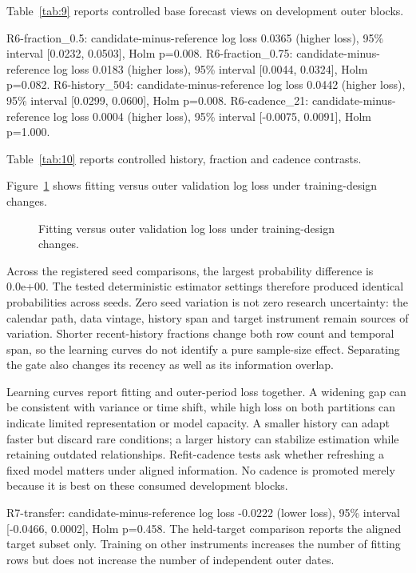 \noindent Table~\ref{tab:9} reports controlled base forecast views on development outer blocks.



R6-fraction\_0.5: candidate-minus-reference log loss 0.0365 (higher loss), 95\% interval [0.0232, 0.0503], Holm p=0.008. R6-fraction\_0.75: candidate-minus-reference log loss 0.0183 (higher loss), 95\% interval [0.0044, 0.0324], Holm p=0.082. R6-history\_504: candidate-minus-reference log loss 0.0442 (higher loss), 95\% interval [0.0299, 0.0600], Holm p=0.008. R6-cadence\_21: candidate-minus-reference log loss 0.0004 (higher loss), 95\% interval [-0.0075, 0.0091], Holm p=1.000.

\noindent Table~\ref{tab:10} reports controlled history, fraction and cadence contrasts.



\noindent Figure~\ref{fig:8} shows fitting versus outer validation log loss under training-design changes.

\begin{figure}[htbp]\centering

\caption{Fitting versus outer validation log loss under training-design changes.}\label{fig:8}
\end{figure}

Across the registered seed comparisons, the largest probability difference is 0.0e+00. The tested deterministic estimator settings therefore produced identical probabilities across seeds. Zero seed variation is not zero research uncertainty: the calendar path, data vintage, history span and target instrument remain sources of variation. Shorter recent-history fractions change both row count and temporal span, so the learning curves do not identify a pure sample-size effect. Separating the gate also changes its recency as well as its information overlap.

Learning curves report fitting and outer-period loss together. A widening gap can be consistent with variance or time shift, while high loss on both partitions can indicate limited representation or model capacity. A smaller history can adapt faster but discard rare conditions; a larger history can stabilize estimation while retaining outdated relationships. Refit-cadence tests ask whether refreshing a fixed model matters under aligned information. No cadence is promoted merely because it is best on these consumed development blocks.

R7-transfer: candidate-minus-reference log loss -0.0222 (lower loss), 95\% interval [-0.0466, 0.0002], Holm p=0.458. The held-target comparison reports the aligned target subset only. Training on other instruments increases the number of fitting rows but does not increase the number of independent outer dates.

